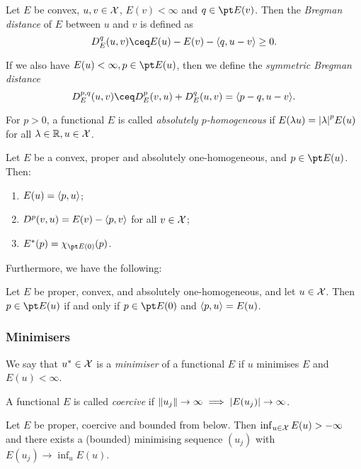 \begin{definition}
	Let $E$ be convex, $u, v \in \mathcal X$, $E(v) < \infty$ and $q \in \pt E(v)$. Then the \emph{Bregman distance} of $E$ between $u$ and $v$ is defined as
	\[
	D_E^q(u, v) \ceq E(u) - E(v) - \ang{q, u -v} \geq 0. 
	\]
	
	If we also have $E(u) < \infty, p \in \pt E(u)$, then we define the \emph{symmetric Bregman distance}
	\[
	D_E^{p, q}(u, v) \ceq D_E^p(v, u) + D_E^q(u, v) = \ang{p - q, u - v}. 
	\]
\end{definition}

\begin{definition}
	For $p > 0$, a functional $E$ is called \emph{absolutely $p$-homogeneous} if $E(\lambda u) = \abs{\lambda}^p E(u)$ for all $\lambda \in \mathbb R, u \in \mathcal X$. 
\end{definition}

\begin{proposition}
	Let $E$ be a convex, proper and absolutely one-homogeneous, and $p \in \pt E(u)$. Then:
	\begin{enumerate}
		\item $E(u) = \langle p, u\rangle$;
		\item $D^p(v, u) = E(v) - \langle p, v\rangle$ for all $v \in \mathcal X$;
		\item $E^*(p) = \chi_{\pt E(0)}(p)$.
	\end{enumerate}  
\end{proposition}

Furthermore, we have the following:
\begin{proposition}
	Let $E$ be proper, convex, and absolutely one-homogeneous, and let $u \in \mathcal X$. Then $p \in \pt E(u)$ if and only if $p \in \pt E(0)$ and $\langle p, u\rangle = E(u)$. 
\end{proposition}

\subsubsection{Minimisers}
\begin{definition}
	We say that $u^* \in \mathcal X$ is a \emph{minimiser} of a  functional $E$ if $u$ minimises $E$ and $E(u) < \infty$. 
\end{definition}

\begin{definition}
	A functional $E$ is called \emph{coercive} if $\norm{u_j} \to \infty \implies \abs{E(u_j)} \to \infty$. 
\end{definition}

\begin{lemma}
	Let $E$ be proper, coercive and bounded from below. Then $\inf_{u \in \mathcal X} E(u) > -\infty$ and there exists a (bounded) minimising sequence $(u_j)$ with $E(u_j) \to \inf_u E(u)$. \end{lemma}

